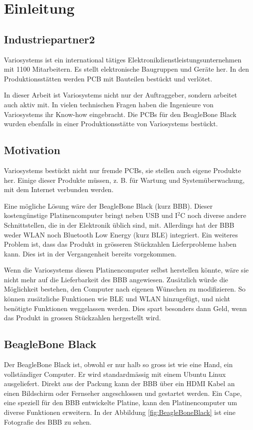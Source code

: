 \chapter{Einleitung}


\section{Industriepartner2}
Variosystems ist ein international tätiges Elektronikdienstleistungsunternehmen mit 1100 Mitarbeitern. Es stellt elektronische Baugruppen und Geräte her. In den Produktionsstätten werden PCB mit Bauteilen bestückt und verlötet. 

In dieser Arbeit ist Variosystems nicht nur der Auftraggeber, sondern arbeitet auch aktiv mit. In vielen technischen Fragen haben die Ingenieure von Variosystems ihr Know-how eingebracht. Die PCBs für den BeagleBone Black wurden ebenfalls in einer Produktionsstätte von Variosystems bestückt.



\section{Motivation}
Variosystems bestückt nicht nur fremde PCBs, sie stellen auch eigene Produkte her. Einige dieser Produkte müssen, z. B. für Wartung und Systemüberwachung, mit dem Internet verbunden werden.

Eine mögliche Lösung wäre der BeagleBone Black (kurz BBB). Dieser kostengünstige Platinencomputer bringt neben USB und I$^2$C noch diverse andere Schnittstellen, die in der Elektronik üblich sind, mit. Allerdings hat der BBB weder WLAN noch Bluetooth Low Energy (kurz BLE) integriert. Ein weiteres Problem ist, dass das Produkt in grösseren Stückzahlen Lieferprobleme haben kann. Dies ist in der Vergangenheit bereits vorgekommen.

Wenn die Variosystems diesen Platinencomputer selbst herstellen könnte, wäre sie nicht mehr auf die Lieferbarkeit des BBB angewiesen. Zusätzlich würde die Möglichkeit bestehen, den Computer nach eigenen Wünschen zu modifizieren. So können zusätzliche Funktionen wie BLE und WLAN hinzugefügt, und nicht benötigte Funktionen weggelassen werden. Dies spart besonders dann Geld, wenn das Produkt in grossen Stückzahlen hergestellt wird.


\section{BeagleBone Black}
Der BeagleBone Black ist, obwohl er nur halb so gross ist wie eine Hand, ein vollständiger Computer. Er wird standardmässig mit einem Ubuntu Linux ausgeliefert. Direkt aus der Packung kann der BBB über ein HDMI Kabel an einen Bildschirm oder Fernseher angeschlossen und gestartet werden. Ein Cape, eine speziell für den BBB entwickelte Platine, kann den Platinencomputer um diverse Funktionen erweitern. In der Abbildung \ref{fig:BeagleBoneBlack} ist eine Fotografie des BBB zu sehen.

